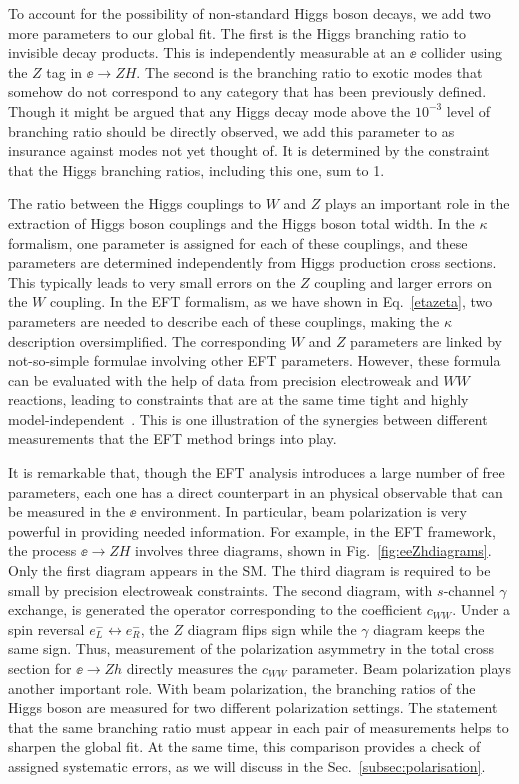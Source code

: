To account for the possibility of non-standard Higgs boson decays, we
add two more parameters to our global fit.  The first is the Higgs branching
ratio to invisible decay products.   This is independently measurable
at an $\ee$ collider using the $Z$ tag in $\ee\to ZH$.  The second is
the branching ratio to exotic modes that somehow do not correspond to
any category that has been previously defined.   Though it might be
argued that any Higgs decay mode above the $10^{-3}$ level of
branching ratio should be directly observed, we add this parameter to
as insurance against modes not yet thought of.  It is determined by the constraint that the 
Higgs branching ratios, including this one, sum to 1.

The ratio between the Higgs couplings to $W$ and $Z$ plays an
important role in the extraction of Higgs boson couplings and the
Higgs boson total width.   In the
$\kappa$ formalism, one parameter is assigned for each of these
couplings, and these parameters are determined independently  from Higgs production
cross sections.   This typically leads to very small errors on the $Z$
coupling and larger errors on the $W$ coupling.  In the EFT
formalism, as we have shown in Eq.~\ref{etazeta}, two
parameters are needed to describe each of these couplings, making the
$\kappa$ description oversimplified.   The
corresponding $W$ and $Z$ parameters are linked by
not-so-simple formulae involving other EFT parameters.  However, these
formula can be evaluated with the help of data from precision
electroweak and $WW$ reactions, leading to  constraints that are at
the same time tight and highly
model-independent~\cite{Barklow:2017awn}.  This is one illustration of
the synergies between different measurements that the EFT method
brings into play. 

It is remarkable that, though the EFT analysis introduces a large
number of free parameters, each one has a direct counterpart in an
physical observable that can be measured in the $\ee$ environment. 
In particular, beam polarization is very powerful in providing needed
information.  For example, in the EFT framework, the process $\ee\to
ZH$ involves three diagrams, shown in Fig.~\ref{fig:eeZhdiagrams}.
Only the first diagram appears in the SM.   The third diagram is
required to be small by precision electroweak constraints.  The second
diagram, with $s$-channel $\gamma$ exchange,  is generated the
operator 
corresponding to the coefficient $c_{WW}$.  Under a spin reversal $e^-_L
\leftrightarrow e^-_R$, the $Z$ diagram flips sign while the 
$\gamma$ diagram keeps the same sign.  Thus,  measurement of the 
polarization asymmetry  in the total cross section for $\ee\to Zh$
directly measures the $c_{WW}$ parameter.   Beam polarization plays
another important role.  With beam polarization, the branching ratios
of the   Higgs boson are measured for  two different   polarization
settings.   The statement that the same branching ratio must appear in
each pair of measurements helps to sharpen the global fit.  At the
same time, this comparison provides a check of assigned systematic
errors, as we will discuss in the Sec.~\ref{subsec:polarisation}. 


